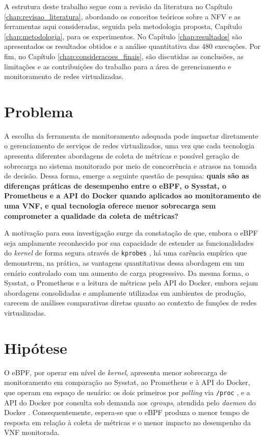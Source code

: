 A estrutura deste trabalho segue com a revisão da literatura no Capítulo \ref{chap:revisao_literatura}, abordando os conceitos teóricos sobre a NFV e as ferramentas aqui consideradas, seguida pela metodologia proposta, Capítulo \ref{chap:metodologia}, para os experimentos. No Capítulo \ref{chap:resultados} são apresentados os resultados obtidos e a análise quantitativa das 480 execuções. Por fim, no Capítulo \ref{chap:consideracoes_finais}, são discutidas as conclusões, as limitações e as contribuições do trabalho para a área de gerenciamento e monitoramento de redes virtualizadas.


\section{Problema}

A escolha da ferramenta de monitoramento adequada pode impactar diretamente o gerenciamento de serviços de redes virtualizados, uma vez que cada tecnologia apresenta diferentes abordagens de coleta de métricas e possível geração de sobrecarga no sistema monitorado por meio de concorrência e atrasos na tomada de decisão. Dessa forma, emerge a seguinte questão de pesquisa: \textbf{quais são as diferenças práticas de desempenho entre o eBPF, o Sysstat, o Prometheus e a API do Docker quando aplicados ao monitoramento de uma VNF, e qual tecnologia oferece menor sobrecarga sem comprometer a qualidade da coleta de métricas?}

A motivação para essa investigação surge da constatação de que, embora o eBPF seja amplamente reconhecido por sua capacidade de estender as funcionalidades do \textit{kernel} de forma segura através de \texttt{kprobes} \cite{bcc_project}, há uma carência empírica que demonstrem, na prática, as vantagens quantitativas dessa abordagem em um cenário controlado \cite{usman_observability_2022} com um aumento de carga progressivo. Da mesma forma, o Sysstat, o Prometheus e a leitura de métricas pela API do Docker, embora sejam abordagens consolidadas e amplamente utilizadas em ambientes de produção, carecem de análises comparativas diretas quanto ao contexto de funções de redes virtualizadas.

\section{Hipótese}

O eBPF, por operar em nível de \textit{kernel}, apresenta menor sobrecarga de monitoramento em comparação ao Sysstat, ao Prometheus e à API do Docker, que operam em espaço de usuário: os dois primeiros por \textit{polling} \cite{rfc9232} via \texttt{/proc} \cite{linux_proc_man}, e a API do Docker por consulta sob demanda aos \textit{cgroups}, atendida pelo \textit{daemon} do Docker \cite{docker_runmetrics}. Consequentemente, espera-se que o eBPF produza o menor tempo de resposta em relação à coleta de métricas e o menor impacto no desempenho da VNF monitorada.

